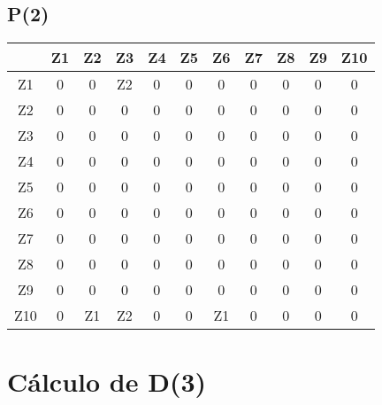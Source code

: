 \documentclass[a4paper,11pt]{article}
\begin{document}
\subsection*{P(2)}
\begin{center}
\begin{tabular}{c|cccccccccc}
 & Z1 & Z2 & Z3 & Z4 & Z5 & Z6 & Z7 & Z8 & Z9 & Z10 \\ \hline
Z1 & 0 & 0 & Z2 & 0 & 0 & 0 & 0 & 0 & 0 & 0 \\
Z2 & 0 & 0 & 0 & 0 & 0 & 0 & 0 & 0 & 0 & 0 \\
Z3 & 0 & 0 & 0 & 0 & 0 & 0 & 0 & 0 & 0 & 0 \\
Z4 & 0 & 0 & 0 & 0 & 0 & 0 & 0 & 0 & 0 & 0 \\
Z5 & 0 & 0 & 0 & 0 & 0 & 0 & 0 & 0 & 0 & 0 \\
Z6 & 0 & 0 & 0 & 0 & 0 & 0 & 0 & 0 & 0 & 0 \\
Z7 & 0 & 0 & 0 & 0 & 0 & 0 & 0 & 0 & 0 & 0 \\
Z8 & 0 & 0 & 0 & 0 & 0 & 0 & 0 & 0 & 0 & 0 \\
Z9 & 0 & 0 & 0 & 0 & 0 & 0 & 0 & 0 & 0 & 0 \\
Z10 & 0 & Z1 & Z2 & 0 & 0 & Z1 & 0 & 0 & 0 & 0 \\
\end{tabular}
\end{center}
\newpage
\section*{Cálculo de D(3)}
\end{document}
